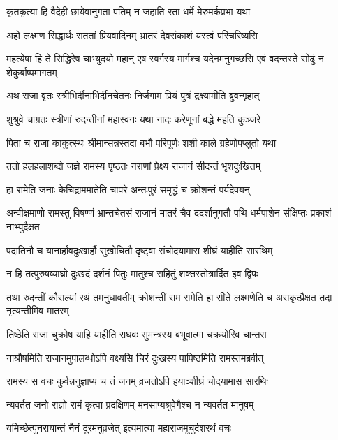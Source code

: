 \twolineshloka
{कृतकृत्या हि वैदेही छायेवानुगता पतिम्}
{न जहाति रता धर्मे मेरुमर्कप्रभा यथा} %

\twolineshloka
{अहो लक्ष्मण सिद्धार्थः सततां प्रियवादिनम्}
{भ्रातरं देवसंकाशं यस्त्वं परिचरिष्यसि} %

\threelineshloka
{महत्येषा हि ते सिद्धिरेष चाभ्युदयो महान्}
{एष स्वर्गस्य मार्गश्च यदेनमनुगच्छसि}
{एवं वदन्तस्ते सोढुं न शेकुर्बाष्पमागतम्} %

\twolineshloka
{अथ राजा वृतः स्त्रीभिर्दीनाभिर्दीनचेतनः}
{निर्जगाम प्रियं पुत्रं द्रक्ष्यामीति ब्रुवन्गृहात्} %

\twolineshloka
{शुश्रुवे चाग्रतः स्त्रीणां रुदन्तीनां महास्वनः}
{यथा नादः करेणूनां बद्धे महति कुञ्जरे} %

\twolineshloka
{पिता च राजा काकुत्स्थः श्रीमान्सन्नस्तदा बभौ}
{परिपूर्णः शशी काले ग्रहेणोपप्लुतो यथा} %

\twolineshloka
{ततो हलहलाशब्दो जज्ञे रामस्य पृष्ठतः}
{नराणां प्रेक्ष्य राजानं सीदन्तं भृशदुःखितम्} %

\twolineshloka
{हा रामेति जनाः केचिद्राममातेति चापरे}
{अन्तःपुरं समृद्धं च क्रोशन्तं पर्यदेवयन्} %

\threelineshloka
{अन्वीक्षमाणो रामस्तु विषण्णं भ्रान्तचेतसं}
{राजानं मातरं चैव ददर्शानुगतौ पथि}
{धर्मपाशेन संक्षिप्तः प्रकाशं नाभ्युदैक्षत} %

\twolineshloka
{पदातिनौ च यानार्हावदुःखार्हौ सुखोचितौ}
{दृष्ट्वा संचोदयामास शीघ्रं याहीति सारथिम्} %

\twolineshloka
{न हि तत्पुरुषव्याघ्रो दुःखदं दर्शनं पितुः}
{मातुश्च सहितुं शक्तस्तोत्रार्दित इव द्विपः} %

\threelineshloka
{तथा रुदन्तीं कौसल्यां रथं तमनुधावतीम्}
{क्रोशन्तीं राम रामेति हा सीते लक्ष्मणेति च}
{असकृत्प्रैक्षत तदा नृत्यन्तीमिव मातरम्} %

\twolineshloka
{तिष्ठेति राजा चुक्रोष याहि याहीति राघवः}
{सुमन्त्रस्य बभूवात्मा चक्रयोरिव चान्तरा} %

\twolineshloka
{नाश्रौषमिति राजानमुपालब्धोऽपि वक्ष्यसि}
{चिरं दुःखस्य पापिष्ठमिति रामस्तमब्रवीत्} %

\twolineshloka
{रामस्य स वचः कुर्वन्ननुज्ञाप्य च तं जनम्}
{व्रजतोऽपि हयाञ्शीघ्रं चोदयामास सारथिः} %

\twolineshloka
{न्यवर्तत जनो राज्ञो रामं कृत्वा प्रदक्षिणम्}
{मनसाप्यश्रुवेगैश्च न न्यवर्तत मानुषम्} %

\twolineshloka
{यमिच्छेत्पुनरायान्तं नैनं दूरमनुव्रजेत्}
{इत्यमात्या महाराजमूचुर्दशरथं वचः} %


